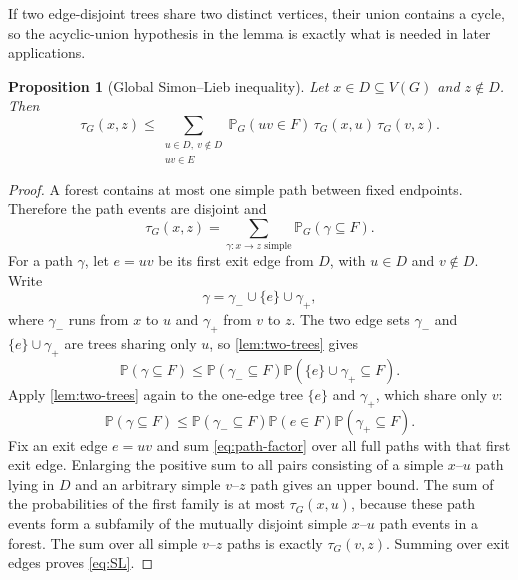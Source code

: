 \documentclass[11pt]{article}
\newtheorem{proposition}[theorem]{Proposition}
\theoremstyle{definition}
\theoremstyle{remark}
\newcommand{\PP}{\mathbb P}
\newcommand{\1}{\mathbf 1}
\begin{document}
If two edge-disjoint trees share two distinct vertices, their union contains a cycle,
so the acyclic-union hypothesis in the lemma is exactly what is needed in later
applications.

\begin{proposition}[Global Simon--Lieb inequality]\label{prop:Simon-Lieb}
Let $x\in D\subseteq V(G)$ and $z\notin D$.  Then
\begin{equation}\label{eq:SL}
 \tau_G(x,z)
 \le
 \sum_{\substack{u\in D,\ v\notin D\\uv\in E}}
 \PP_G(uv\in F)\,\tau_G(x,u)\,\tau_G(v,z).
\end{equation}
\end{proposition}

\begin{proof}
A forest contains at most one simple path between fixed endpoints.  Therefore the
path events are disjoint and
\begin{equation}\label{eq:path-sum}
 \tau_G(x,z)=\sum_{\gamma:x\to z\text{ simple}}\PP_G(\gamma\subseteq F).
\end{equation}
For a path $\gamma$, let $e=uv$ be its first exit edge from $D$, with $u\in D$ and
$v\notin D$.  Write
\begin{equation}
 \gamma=\gamma_-\cup\{e\}\cup\gamma_+,
\end{equation}
where $\gamma_-$ runs from $x$ to $u$ and $\gamma_+$ from $v$ to $z$.  The two edge
sets $\gamma_-$ and $\{e\}\cup\gamma_+$ are trees sharing only $u$, so
\cref{lem:two-trees} gives
\begin{equation}
 \PP(\gamma\subseteq F)
 \le \PP(\gamma_-\subseteq F)
 \PP(\{e\}\cup\gamma_+\subseteq F).
\end{equation}
Apply \cref{lem:two-trees} again to the one-edge tree $\{e\}$ and $\gamma_+$, which
share only $v$:
\begin{equation}\label{eq:path-factor}
 \PP(\gamma\subseteq F)
 \le \PP(\gamma_-\subseteq F)\PP(e\in F)
 \PP(\gamma_+\subseteq F).
\end{equation}
Fix an exit edge $e=uv$ and sum \eqref{eq:path-factor} over all full paths with that
first exit edge.  Enlarging the positive sum to all pairs consisting of a simple
$x$--$u$ path lying in $D$ and an arbitrary simple $v$--$z$ path gives an upper
bound.  The sum of the probabilities of the first family is at most $\tau_G(x,u)$,
because these path events form a subfamily of the mutually disjoint simple
$x$--$u$ path events in a forest.  The sum over all simple $v$--$z$ paths is exactly
$\tau_G(v,z)$.  Summing over exit edges proves \eqref{eq:SL}.
\end{proof}
\end{document}
